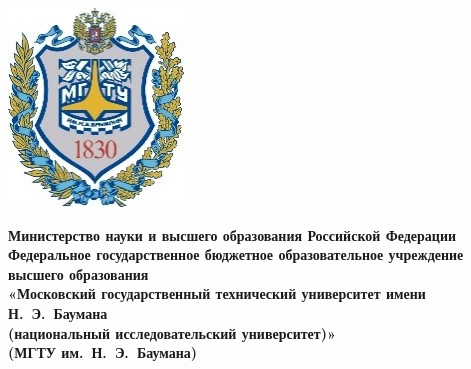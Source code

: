 \newcommand{\fixunderline}[3]
{
	$\underset{\text{#3}}{\text{\uline{\stackengine{0pt}{\hspace{#2}}{\text{#1}}{O}{c}{F}{F}{L}}}}$
}

\begin{titlepage}
	\fontsize{12pt}{12pt}\selectfont
	\noindent \begin{minipage}{0.15\textwidth}
		\includegraphics[width=\linewidth]{img/b_logo.jpg}
	\end{minipage}
	\noindent\begin{minipage}{0.9\textwidth}\centering
		\textbf{Министерство науки и высшего образования Российской Федерации}\\
		\textbf{Федеральное государственное бюджетное образовательное учреждение высшего образования}\\
		\textbf{«Московский государственный технический университет имени Н.~Э.~Баумана}\\
		\textbf{(национальный исследовательский университет)»}\\
		\textbf{(МГТУ им.~Н.~Э.~Баумана)}
	\end{minipage}
	

\end{titlepage}
